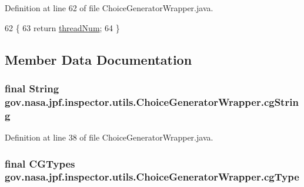 Definition at line 62 of file Choice\+Generator\+Wrapper.\+java.


\begin{DoxyCode}
62                              \{
63     \textcolor{keywordflow}{return} \hyperlink{classgov_1_1nasa_1_1jpf_1_1inspector_1_1utils_1_1_choice_generator_wrapper_a81cb8b377c3934a700c27d479e9a822a}{threadNum};
64   \}
\end{DoxyCode}


\subsection{Member Data Documentation}
\subsubsection[{\texorpdfstring{cg\+String}{cgString}}]{\setlength{\rightskip}{0pt plus 5cm}final String gov.\+nasa.\+jpf.\+inspector.\+utils.\+Choice\+Generator\+Wrapper.\+cg\+String\hspace{0.3cm}{\ttfamily [private]}}\hypertarget{classgov_1_1nasa_1_1jpf_1_1inspector_1_1utils_1_1_choice_generator_wrapper_a5f00af2fdb84e718d701dca82521b412}{}\label{classgov_1_1nasa_1_1jpf_1_1inspector_1_1utils_1_1_choice_generator_wrapper_a5f00af2fdb84e718d701dca82521b412}


Definition at line 38 of file Choice\+Generator\+Wrapper.\+java.

\subsubsection[{\texorpdfstring{cg\+Type}{cgType}}]{\setlength{\rightskip}{0pt plus 5cm}final {\bf C\+G\+Types} gov.\+nasa.\+jpf.\+inspector.\+utils.\+Choice\+Generator\+Wrapper.\+cg\+Type\hspace{0.3cm}{\ttfamily [private]}}\hypertarget{classgov_1_1nasa_1_1jpf_1_1inspector_1_1utils_1_1_choice_generator_wrapper_aeb97dd901024e91ef0501b520a05bb11}{}\label{classgov_1_1nasa_1_1jpf_1_1inspector_1_1utils_1_1_choice_generator_wrapper_aeb97dd901024e91ef0501b520a05bb11}


